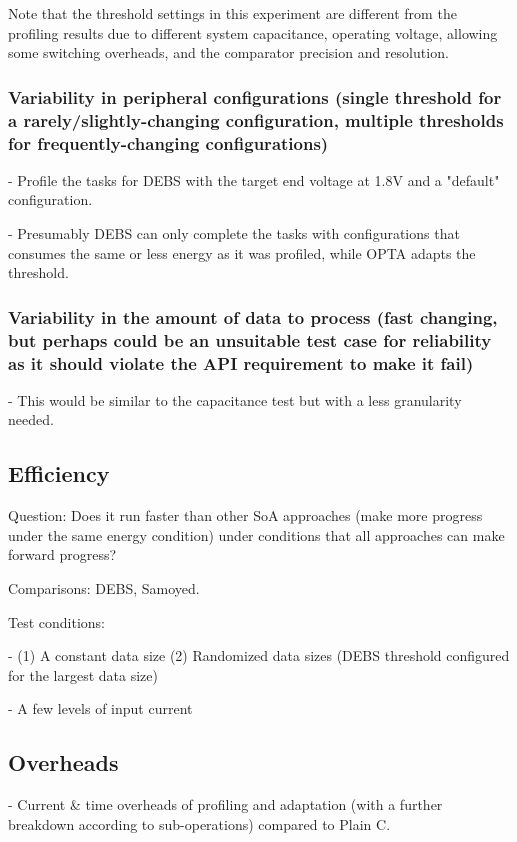 Note that the threshold settings in this experiment are different from the profiling results due to different system capacitance, operating voltage, allowing some switching overheads, and the comparator precision and resolution. 

\subsubsection{Variability in peripheral configurations (single threshold for a rarely/slightly-changing configuration, multiple thresholds for frequently-changing configurations)}

- Profile the tasks for DEBS with the target end voltage at 1.8V and a "default" configuration. 
    
- Presumably DEBS can only complete the tasks with configurations that consumes the same or less energy as it was profiled, while OPTA adapts the threshold. 

\subsubsection{Variability in the amount of data to process (fast changing, but perhaps could be an unsuitable test case for reliability as it should violate the API requirement to make it fail)}
    
- This would be similar to the capacitance test but with a less granularity needed.

\subsection{Efficiency}

Question: Does it run faster than other SoA approaches (make more progress under the same energy condition) under conditions that all approaches can make forward progress?

Comparisons: DEBS, Samoyed.

Test conditions:
    
- (1) A constant data size (2) Randomized data sizes (DEBS threshold configured for the largest data size)

- A few levels of input current

\subsection{Overheads}

- Current \& time overheads of profiling and adaptation (with a further breakdown according to sub-operations) compared to Plain C. 

